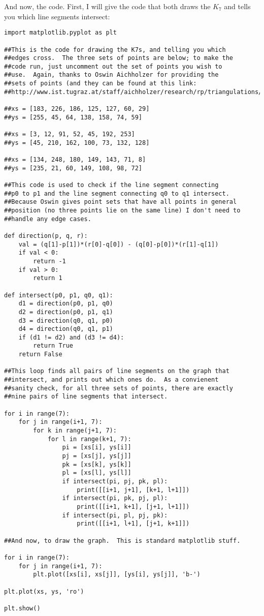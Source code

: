 \documentclass[11pt]{article}
\theoremstyle{definition}
\begin{document}
And now, the code.  First, I will give the code that both draws the $K_7$ and tells you which line segments intersect:
\begin{verbatim}
import matplotlib.pyplot as plt

##This is the code for drawing the K7s, and telling you which
##edges cross.  The three sets of points are below; to make the
##code run, just uncomment out the set of points you wish to
##use.  Again, thanks to Oswin Aichholzer for providing the
##sets of points (and they can be found at this link:
##http://www.ist.tugraz.at/staff/aichholzer/research/rp/triangulations/crossing/)

##xs = [183, 226, 186, 125, 127, 60, 29]
##ys = [255, 45, 64, 138, 158, 74, 59]

##xs = [3, 12, 91, 52, 45, 192, 253]
##ys = [45, 210, 162, 100, 73, 132, 128]

##xs = [134, 248, 180, 149, 143, 71, 8]
##ys = [235, 21, 60, 149, 108, 98, 72]

##This code is used to check if the line segment connecting
##p0 to p1 and the line segment connecting q0 to q1 intersect.
##Because Oswin gives point sets that have all points in general
##position (no three points lie on the same line) I don't need to
##handle any edge cases.

def direction(p, q, r):
    val = (q[1]-p[1])*(r[0]-q[0]) - (q[0]-p[0])*(r[1]-q[1])
    if val < 0:
        return -1
    if val > 0:
        return 1

def intersect(p0, p1, q0, q1):
    d1 = direction(p0, p1, q0)
    d2 = direction(p0, p1, q1)
    d3 = direction(q0, q1, p0)
    d4 = direction(q0, q1, p1)
    if (d1 != d2) and (d3 != d4):
        return True
    return False

##This loop finds all pairs of line segments on the graph that
##intersect, and prints out which ones do.  As a convienent
##sanity check, for all three sets of points, there are exactly
##nine pairs of line segments that intersect.

for i in range(7):
    for j in range(i+1, 7):
        for k in range(j+1, 7):
            for l in range(k+1, 7):
                pi = [xs[i], ys[i]]
                pj = [xs[j], ys[j]]
                pk = [xs[k], ys[k]]
                pl = [xs[l], ys[l]]
                if intersect(pi, pj, pk, pl):
                    print([[i+1, j+1], [k+1, l+1]])
                if intersect(pi, pk, pj, pl):
                    print([[i+1, k+1], [j+1, l+1]])
                if intersect(pi, pl, pj, pk):
                    print([[i+1, l+1], [j+1, k+1]])

##And now, to draw the graph.  This is standard matplotlib stuff.

for i in range(7):
    for j in range(i+1, 7):
        plt.plot([xs[i], xs[j]], [ys[i], ys[j]], 'b-')

plt.plot(xs, ys, 'ro')

plt.show()
\end{verbatim}
\end{document}
